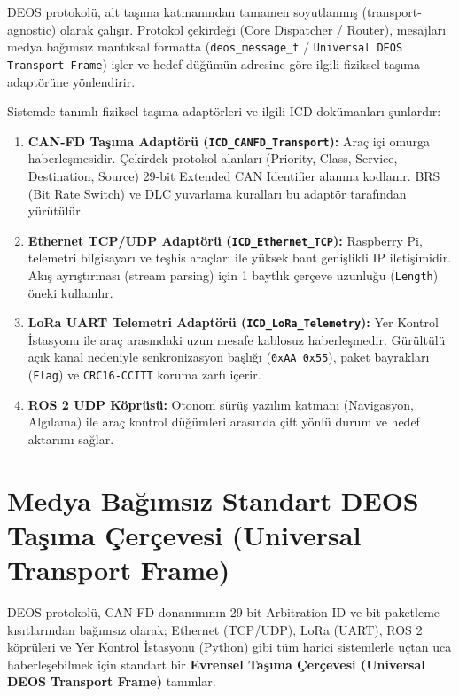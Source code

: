 \documentclass[a4paper,10pt]{article}
\newcommand{\code}[1]{\texttt{#1}}
\begin{document}
DEOS protokolü, alt taşıma katmanından tamamen soyutlanmış (transport-agnostic) olarak çalışır. Protokol çekirdeği (Core Dispatcher / Router), mesajları medya bağımsız mantıksal formatta (\code{deos\_message\_t} / \code{Universal DEOS Transport Frame}) işler ve hedef düğümün adresine göre ilgili fiziksel taşıma adaptörüne yönlendirir.

Sistemde tanımlı fiziksel taşıma adaptörleri ve ilgili ICD dokümanları şunlardır:

\begin{enumerate}
    \item \textbf{CAN-FD Taşıma Adaptörü (\code{ICD\_CANFD\_Transport}):}
    Araç içi omurga haberleşmesidir. Çekirdek protokol alanları (Priority, Class, Service, Destination, Source) 29-bit Extended CAN Identifier alanına kodlanır. BRS (Bit Rate Switch) ve DLC yuvarlama kuralları bu adaptör tarafından yürütülür.
    
    \item \textbf{Ethernet TCP/UDP Adaptörü (\code{ICD\_Ethernet\_TCP}):}
    Raspberry Pi, telemetri bilgisayarı ve teşhis araçları ile yüksek bant genişlikli IP iletişimidir. Akış ayrıştırması (stream parsing) için 1 baytlık çerçeve uzunluğu (\code{Length}) öneki kullanılır.
    
    \item \textbf{LoRa UART Telemetri Adaptörü (\code{ICD\_LoRa\_Telemetry}):}
    Yer Kontrol İstasyonu ile araç arasındaki uzun mesafe kablosuz haberleşmedir. Gürültülü açık kanal nedeniyle senkronizasyon başlığı (\code{0xAA 0x55}), paket bayrakları (\code{Flag}) ve \code{CRC16-CCITT} koruma zarfı içerir.
    
    \item \textbf{ROS 2 UDP Köprüsü:}
    Otonom sürüş yazılım katmanı (Navigasyon, Algılama) ile araç kontrol düğümleri arasında çift yönlü durum ve hedef aktarımı sağlar.
\end{enumerate}

\section{Medya Bağımsız Standart DEOS Taşıma Çerçevesi (Universal Transport Frame)}

DEOS protokolü, CAN-FD donanımının 29-bit Arbitration ID ve bit paketleme kısıtlarından bağımsız olarak; Ethernet (TCP/UDP), LoRa (UART), ROS 2 köprüleri ve Yer Kontrol İstasyonu (Python) gibi tüm harici sistemlerle uçtan uca haberleşebilmek için standart bir \textbf{Evrensel Taşıma Çerçevesi (Universal DEOS Transport Frame)} tanımlar.
\end{document}
